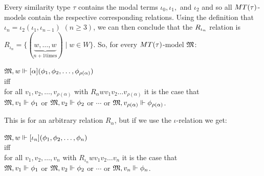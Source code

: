 \par Every similarity type $\tau$ contains the modal terms $\iota_0, \iota_1,$ and $\iota_2$ and so all $MT(\tau)$-models contain the respective corresponding relations. Using the definition that $\iota_n = \iota_2(\iota_1, \iota_{n-1})$ $(n\geq3)$, we can then conclude that the $R_{\iota_n}$ relation is $R_{\iota_n} = \{ (\underbrace{w,\ldots,w}_{n+1 \text{times}}) \mid w\in W\}$. So, for every $MT(\tau)$-model $\mathfrak{M}$:










\begin{center}

    $\mathfrak{M}, w \Vdash [\alpha](\phi_1, \phi_2, \ldots, \phi_{\rho(\alpha)})$\\

    iff\\

    for all $v_1,v_2, \ldots, v_{\rho(\alpha)}$ with $R_{\alpha}wv_1v_2\ldots v_{\rho(\alpha)}$ it is the case that\\

    $\mathfrak{M}, v_1\Vdash\phi_1$ or $\mathfrak{M}, v_2\Vdash\phi_2$ or $\cdots$ or $\mathfrak{M}, v_{\rho(\alpha)}\Vdash\phi_{\rho(\alpha)}$.

\end{center}



\par This is for an arbitrary relation $R_\alpha$, but if we use the $\iota$-relation we get:

\begin{center}

    $\mathfrak{M}, w \Vdash [\iota_n](\phi_1, \phi_2, \ldots, \phi_{n})$\\

    iff\\

    for all $v_1,v_2, \ldots, v_{n}$ with $R_{\iota_n}wv_1v_2\ldots v_{n}$ it is the case that\\

    $\mathfrak{M}, v_1\Vdash\phi_1$ or $\mathfrak{M}, v_2\Vdash\phi_2$ or $\cdots$ or $\mathfrak{M}, v_{n}\Vdash\phi_{n}$.

\end{center}

